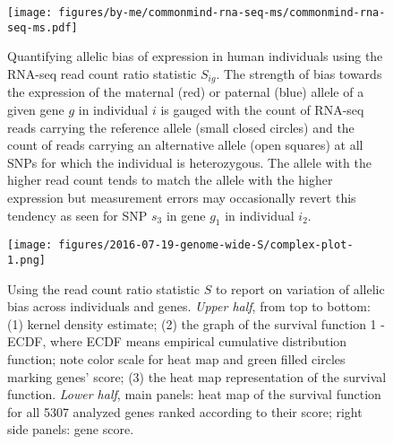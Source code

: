 \documentclass[letterpaper]{article}
\begin{document}
\begin{figure}[h]
\begin{center}
\texttt{[image: figures/by-me/commonmind-rna-seq-ms/commonmind-rna-seq-ms.pdf]}
\end{center}
\caption{ Quantifying allelic bias of expression in human
individuals using the RNA-seq read count ratio statistic \(S_{ig}\).  The strength of
bias towards the expression of the maternal (red) or paternal (blue) allele of
a given gene \(g\) in individual \(i\) is gauged with the count of RNA-seq
reads carrying the reference allele (small closed circles) and the count of
reads carrying an alternative allele (open squares) at all SNPs for which the
individual is heterozygous.  The allele with the higher read count tends to
match the allele with the higher expression but measurement errors may
occasionally revert this tendency as seen for SNP \(s_3\) in gene \(g_1\) in
individual \(i_2\).
}
\label{fig:study-design}
\end{figure}

\begin{figure}[h]
\begin{center}
\texttt{[image: figures/2016-07-19-genome-wide-S/complex-plot-1.png]}
\end{center}
\caption{
Using the read count ratio statistic \(S\) to report on variation of allelic
bias across individuals and genes.  \emph{Upper half}, from top to bottom: (1)
kernel density estimate; (2) the graph of the survival function 1 - ECDF,
where ECDF means empirical cumulative distribution function; note color scale
for heat map and green filled circles marking genes' score; (3) the heat map
representation of the survival function.  \emph{Lower half}, main panels: heat
map of the survival function for all 5307 analyzed genes ranked according to
their score; right side panels: gene score.
}
\label{fig:ranking-genes}
\end{figure}
\end{document}
